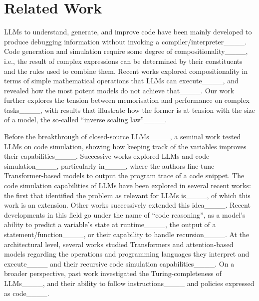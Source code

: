 \section{Related Work}
LLMs to understand, generate, and improve code have been mainly developed to produce debugging information without invoking a compiler/interpreter____.
Code generation and simulation require some degree of compositionality____, i.e., the result of complex expressions can be determined by their constituents and the rules used to combine them.
Recent works explored compositionality in terms of simple mathematical operations that LLMs can execute____, and revealed how the most potent models do not achieve that____.
Our work further explores the tension between memorisation and performance on complex tasks____, with results that illustrate how the former is at tension with the size of a model, the so-called ``inverse scaling law''____.

Before the breakthrough of closed-source LLMs____, a seminal work tested LLMs on code simulation, showing how keeping track of the variables improves their capabilities____. Successive works explored LLMs and code simulation____, particularly in____, where the authors fine-tune Transformer-based models to output the program trace of a code snippet. 
The code simulation capabilities of LLMs have been explored in several recent works: the first that identified the problem as relevant for LLMs is____, of which this work is an extension. Other works successively extended this idea____.
Recent developments in this field go under the name of ``code reasoning'', as a model's ability to predict a variable's state at runtime____, the output of a statement/function____, or their capability to handle recursion____.
At the architectural level, several works studied Transformers and attention-based models regarding the operations and programming languages they interpret and execute____ and their recursive code simulation capabilities____.
On a broader perspective, past work investigated the Turing-completeness of LLMs____, and their ability to follow instructions____ and policies expressed as code____.